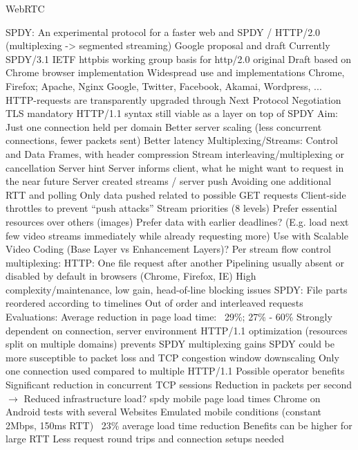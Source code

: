 WebRTC \cite{webrtcdraft}


SPDY: An experimental protocol for a faster web \cite{google2011SPDYdef} and \cite{google2010SPDYwp} 
SPDY / \gls{HTTP}/2.0 (multiplexing -> segmented streaming)
 Google proposal and draft
	Currently SPDY/3.1 
	IETF httpbis working group basis for http/2.0
 original Draft based on Chrome browser implementation
 Widespread use and implementations
	Chrome, Firefox; Apache, Nginx
	Google, Twitter, Facebook, Akamai, Wordpress, ...
	HTTP-requests are transparently upgraded through Next Protocol Negotiation
 TLS mandatory
 HTTP/1.1 syntax still viable as a layer on top of SPDY
 Aim: Just one connection held per domain
	Better server scaling (less concurrent connections, fewer packets sent)
	Better latency
Multiplexing/Streams:
 Control and Data Frames, with header compression
 Stream interleaving/multiplexing or cancellation
 Server hint
	Server informs client, what he might want to request in the near future
 Server created streams / server push
	Avoiding one additional RTT and polling
	Only data pushed related to possible GET requests
	Client-side throttles to prevent ``push attacks''
 Stream priorities (8 levels)
	Prefer essential resources over others (images)
	Prefer data with earlier deadlines? (E.g. load next few video streams immediately while already requesting more)
 Use with Scalable Video Coding (Base Layer vs Enhancement Layers)?
 Per stream flow control
multiplexing:
 HTTP: One file request after another
	Pipelining usually absent or disabled by default in browsers (Chrome, Firefox, IE)
	High complexity/maintenance, low gain, head-of-line blocking issues
 SPDY: File parts reordered according to timelines
	Out of order and interleaved requests
Evaluations:
	Average reduction in page load time: ~29\%; 27\% - 60\%
	Strongly dependent on connection, server environment
	HTTP/1.1 optimization (resources split on multiple domains) prevents SPDY multiplexing gains
 SPDY could be more susceptible to packet loss and TCP congestion window downscaling
	Only one connection used compared to multiple HTTP/1.1
 Possible operator benefits
	Significant reduction in concurrent TCP sessions
	Reduction in packets per second
	$\rightarrow$ Reduced infrastructure load?
spdy mobile page load times
 Chrome on Android tests with several Websites
 Emulated mobile conditions (constant 2Mbps, 150ms RTT)
 ~23\% average load time reduction
 Benefits can be higher for large RTT
	Less request round trips and connection setups needed



